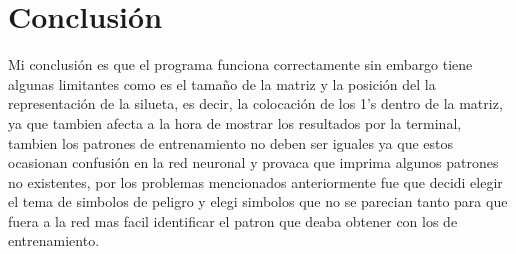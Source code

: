 \documentclass[10pt]{article}         %
\begin{document}
\section{Conclusión}
Mi conclusión es que el programa funciona correctamente sin embargo tiene algunas limitantes como es el tamaño de la matriz y la posición del la representación de la silueta, es decir, la colocación de los 1's dentro de la matriz, ya que tambien afecta a la hora de mostrar los resultados por la terminal, tambien los patrones de entrenamiento no deben ser iguales ya que estos ocasionan confusión en la red neuronal y provaca que imprima algunos patrones no existentes, por los problemas mencionados anteriormente fue que decidi elegir el tema de simbolos de peligro y elegi simbolos que no se parecian tanto para que fuera a la red mas facil identificar el patron que deaba obtener con los de entrenamiento.

	
\end{document}
